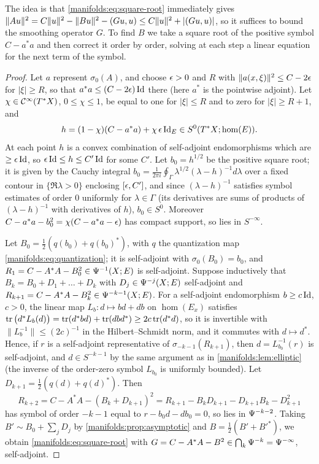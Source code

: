 The idea is that \eqref{manifolds:eq:square-root} immediately gives
$\|Au\|^2=C\|u\|^2-\|Bu\|^2-( Gu, u)\le C\|u\|^2+|( Gu, u)|$, so it
suffices to bound the smoothing operator $G$. To find $B$ we take a square
root of the positive symbol $C-a^*a$ and then correct it order by order,
solving at each step a linear equation for the next term of the symbol.

\begin{proof}
Let $a$ represent $\sigma_0(A)$, and choose $\epsilon>0$ and $R$ with
$\|a(x,\xi)\|^2\le C-2\epsilon$ for $|\xi|\ge R$, so that $a^*a\le(C-2\epsilon)\operatorname{Id}$ there (here
$a^*$ is the pointwise adjoint). Let $\chi\in\mathcal{C}^\infty(T^*X)$, $0\le\chi\le1$, be equal to
one for $|\xi|\le R$ and to zero for $|\xi|\ge R+1$, and
\begin{equation*}
h=(1-\chi)(C-a^*a)+\chi\,\epsilon\operatorname{Id}_E\in S^0(T^*X;\hom(E)).
\end{equation*}
At each point $h$ is a convex combination of self-adjoint endomorphisms which are
$\ge\epsilon\operatorname{Id}$, so $\epsilon\operatorname{Id}\le h\le C'\operatorname{Id}$ for some $C'$. Let $b_0=h^{1/2}$ be the
positive square root; it is given by the Cauchy integral
$b_0=\frac1{2\pi i}\oint_\Gamma\lambda^{1/2}(\lambda-h)^{-1}d\lambda$ over a fixed contour in
$\{\Re\lambda>0\}$ enclosing $[\epsilon,C']$, and since $(\lambda-h)^{-1}$ satisfies symbol
estimates of order $0$ uniformly for $\lambda\in\Gamma$ (its derivatives are sums of
products of $(\lambda-h)^{-1}$ with derivatives of $h$), $b_0\in S^0$. Moreover
$C-a^*a-b_0^2=\chi(C-a^*a-\epsilon)$ has compact support, so lies in $S^{-\infty}$.

Let $B_0=\frac12(q(b_0)+q(b_0)^*)$, with $q$ the quantization map
\eqref{manifolds:eq:quantization}; it is self-adjoint with $\sigma_0(B_0)=b_0$, and
$R_1=C-A^*A-B_0^2\in\Psi^{-1}(X;E)$ is self-adjoint. Suppose inductively that
$B_k=B_0+D_1+\dots+D_k$ with $D_j\in\Psi^{-j}(X;E)$ self-adjoint and
$R_{k+1}=C-A^*A-B_k^2\in\Psi^{-k-1}(X;E)$. For a self-adjoint endomorphism $b\ge c\operatorname{Id}$,
$c>0$, the linear map $L_b:d\mapsto bd+db$ on $\hom(E_x)$ satisfies
$\operatorname{tr}\big(d^*L_b(d)\big)=\operatorname{tr}(d^*bd)+\operatorname{tr}(dbd^*)\ge2c\operatorname{tr}(d^*d)$, so it is invertible with
$\|L_b^{-1}\|\le(2c)^{-1}$ in the Hilbert--Schmidt norm, and it commutes with
$d\mapsto d^*$. Hence, if $r$ is a self-adjoint representative of
$\sigma_{-k-1}(R_{k+1})$, then $d=L_{b_0}^{-1}(r)$ is self-adjoint, and
$d\in S^{-k-1}$ by the same argument as in \cref{manifolds:lem:elliptic} (the
inverse of the order-zero symbol $L_{b_0}$ is uniformly bounded). Let
$D_{k+1}=\frac12(q(d)+q(d)^*)$. Then
\begin{equation*}
R_{k+2}=C-A^*A-(B_k+D_{k+1})^2=R_{k+1}-B_kD_{k+1}-D_{k+1}B_k-D_{k+1}^2
\end{equation*}
has symbol of order $-k-1$ equal to $r-b_0d-db_0=0$, so lies in $\Psi^{-k-2}$.
Taking $B'\sim B_0+\sum_jD_j$ by \cref{manifolds:prop:asymptotic} and
$B=\frac12(B'+B'^*)$, we obtain \eqref{manifolds:eq:square-root} with
$G=C-A^*A-B^2\in\bigcap_k\Psi^{-k}=\Psi^{-\infty}$, self-adjoint.


\end{proof}
